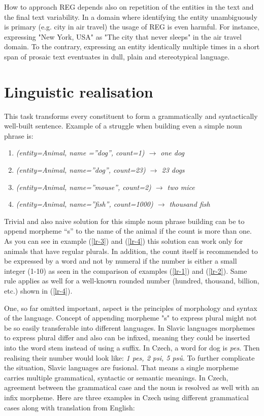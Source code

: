 How to approach REG depends also on repetition of the entities in the text and the final text variability. In a domain where identifying the entity unambiguously is primary (e.g. city in air travel) the usage of REG is even harmful. For instance, expressing "New York, USA" as "The city that never sleeps" in the air travel domain. To the contrary, expressing an entity identically multiple times in a short span of prosaic text eventuates in dull, plain and stereotypical language. 

\section{Linguistic realisation}\label{section:lr}
This task transforms every constituent to form a grammatically and syntactically well-built sentence. Example of a struggle when building even a simple noun phrase is:
\begin{enumerate}
	\item \emph{(entity=Animal, name =”dog”, count=1) $\rightarrow$ one dog} \label{lr-1}
	\item \emph{(entity=Animal, name=”dog”, count=23) $\rightarrow$ 23 dogs} \label{lr-2}
	\item \emph{(entity=Animal, name=”mouse”, count=2) $\rightarrow$ two mice} \label{lr-3}
	\item \emph{(entity=Animal, name=”fish”, count=1000) $\rightarrow$ thousand fish} \label{lr-4}
\end{enumerate}

Trivial and also naive solution for this simple noun phrase building can be to append morpheme “s” to the name of the animal if the count is more than one. As you can see in example (\ref{lr-3}) and (\ref{lr-4}) this solution can work only for animals that have regular plurals. In addition, the count itself is recommended to be expressed by a word and not by numeral if the number is either a small integer (1-10) as seen in the comparison of  examples (\ref{lr-1}) and (\ref{lr-2}). Same rule applies as well for a well-known rounded number (hundred, thousand, billion, etc.) shown in (\ref{lr-4}).

One, so far omitted important, aspect is the principles of morphology and syntax of the language. Concept of appending morpheme "s" to express plural might not be so easily transferable into different languages. In Slavic languages morphemes to express plural differ and also can be infixed, meaning they could be inserted into the word stem instead of using a suffix. In Czech, a word for dog is \emph{pes}. Then realising their number would look like: \emph{1 pes, 2 psi, 5 psů}. To further complicate the situation, Slavic languages are fusional. That means a single morpheme carries multiple grammatical, syntactic or semantic meanings. In Czech, agreement between the grammatical case and the noun is resolved as well with an infix morpheme. Here are three examples in Czech using different grammatical cases along with translation from English:

